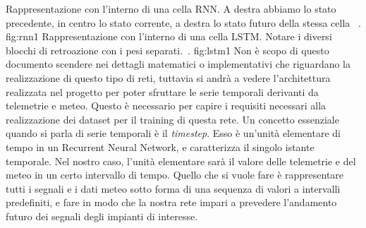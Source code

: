 {Rappresentazione con l'interno di una cella RNN. A destra abbiamo lo stato precedente, in centro lo stato corrente, a destra lo stato futuro della stessa cella ~\cite{colah}.}
{fig:rnn1}
{Rappresentazione con l'interno di una cella LSTM. Notare i diversi blocchi di retroazione con i pesi separati.~\cite{colah}.}
{fig:lstm1}
Non è scopo di questo documento scendere nei dettagli matematici o implementativi che riguardano la realizzazione di questo tipo di reti, tuttavia si andrà a vedere l’architettura realizzata nel progetto per poter sfruttare le serie temporali derivanti da telemetrie e meteo. Questo è necessario per capire i requisiti necessari alla realizzazione dei dataset per il training di questa rete.
Un concetto essenziale quando si parla di serie temporali è il \textit{timestep}. Esso è un’unità elementare di tempo in un Recurrent Neural Network, e caratterizza il singolo istante temporale. Nel nostro caso, l’unità elementare sarà il valore delle telemetrie e del meteo in un certo intervallo di tempo. Quello che si vuole fare è rappresentare tutti i segnali e i dati meteo sotto forma di una sequenza di valori a intervalli predefiniti, e fare in modo che la nostra rete impari a prevedere l’andamento futuro dei segnali degli impianti di interesse.
